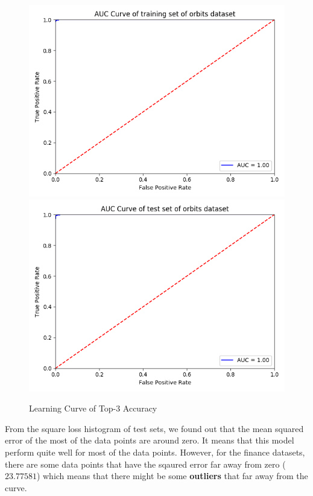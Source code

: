 \documentclass{article}
\begin{document}
\begin{figure}[h]
  \centering
  \includegraphics[scale=0.3]{orbits_auc_train.png}
  \includegraphics[scale=0.3]{orbits_auc_test.png}
  \caption{Learning Curve of Top-3 Accuracy}
\end{figure}

From the square loss histogram of test sets, we found out that the mean squared error of the most of the data points are around zero. It means that this model perform quite well for most of the data points. However, for the finance datasets, there are some data points that have the sqaured error far away from zero ($23.77581$) which means that there might be some \textbf{outliers} that far away from the curve.
\end{document}
